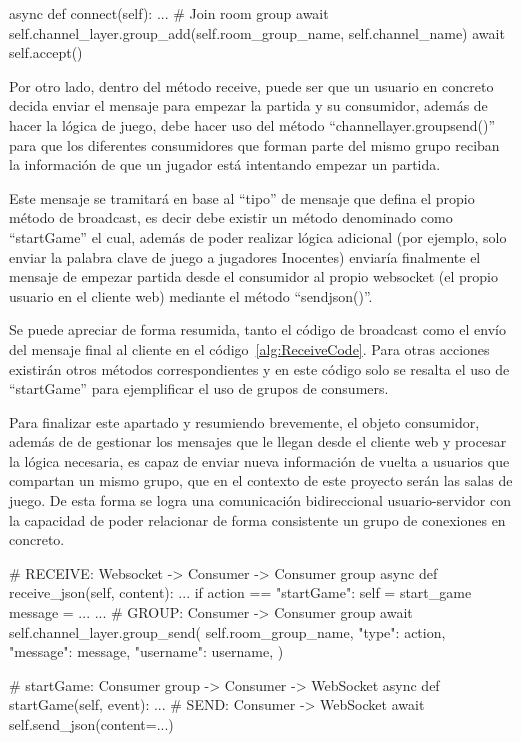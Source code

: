 \begin{mypython}[float={h},caption={Añadir consumer a un grupo},label={alg:JoinGroup}]
	async def connect(self):
		...
		# Join room group
		await self.channel_layer.group_add(self.room_group_name, self.channel_name)
		await self.accept()
									
\end{mypython}

Por otro lado, dentro del método receive, puede ser que un usuario en concreto decida enviar el mensaje para empezar la partida y su consumidor, además de hacer la lógica de juego, 
debe hacer uso del método ``channel\textunderscore layer.group\textunderscore send()'' para que los diferentes consumidores que forman parte del mismo grupo reciban la 
información de que un jugador está intentando empezar un partida. 

Este mensaje se tramitará en base al ``tipo'' de mensaje que defina el propio método de broadcast, es decir debe
existir un método denominado como ``startGame'' el cual, además de poder realizar lógica adicional (por ejemplo, solo enviar la palabra clave de juego a jugadores Inocentes) 
enviaría finalmente el mensaje de empezar partida desde el consumidor al propio websocket (el propio usuario en el cliente web) mediante el método ``send\textunderscore json()''. 

Se puede apreciar de forma resumida, tanto el código de broadcast como el envío del mensaje final al cliente en el código~\ref{alg:ReceiveCode}. Para otras acciones existirán
otros métodos correspondientes y en este código solo se resalta el uso de ``startGame'' para ejemplificar el uso de grupos de consumers.

Para finalizar este apartado y resumiendo brevemente, el objeto consumidor, además de de gestionar los mensajes que le llegan desde el cliente web y procesar la lógica necesaria, 
es capaz de enviar nueva información de vuelta a usuarios que compartan un mismo grupo, que en el contexto de este proyecto serán las salas de juego. De esta forma se logra
una comunicación bidireccional usuario-servidor con la capacidad de poder relacionar de forma consistente un grupo de conexiones en concreto.

\begin{mypython}[float={h},caption={Broadcast a todos los consumidores y envío final al cliente},label={alg:ReceiveCode}]
						
	# RECEIVE: Websocket -> Consumer -> Consumer group
	async def receive_json(self, content):
		...	
		if action == "startGame":
		self = start_game
		message = {...}
		...	
		# GROUP: Consumer -> Consumer group
		await self.channel_layer.group_send(
		self.room_group_name,
		{"type": action, "message": message, "username": username},
		)
					
	# startGame: Consumer group -> Consumer -> WebSocket
	async def startGame(self, event):
		...
		# SEND: Consumer -> WebSocket
		await self.send_json(content={...})
									
\end{mypython}

